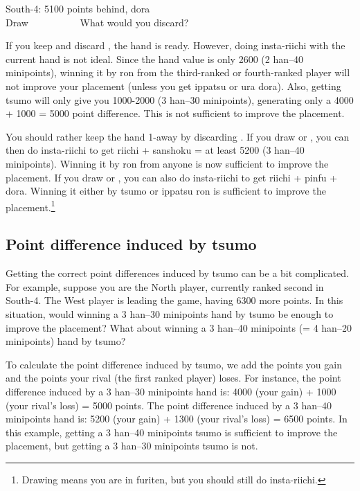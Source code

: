 \bigskip
\begin{itembox}[r]{South-4: 5100 points behind, {\jap dora} {\Large{}}}
\bp
{}~~\\
\hfill\footnotesize{Draw~~~~~~~~~~}
\ep
\vspace{-17pt}
What would you discard?
\end{itembox}
\noindent If you keep {\LARGE{}} and discard {\LARGE{}}, the hand is ready. However, doing insta-riichi with the current hand is not ideal. Since the hand value is only 2600 (2 {\jap han}--40 minipoints), winning it by {\jap ron} from the third-ranked or fourth-ranked player will not improve your placement (unless you get {\jap ippatsu} or {\jap ura dora}). Also, getting {\jap tsumo} will only give you 1000-2000 (3 {\jap han}--30 minipoints), generating only a 4000 + 1000 = 5000 point difference. This is not sufficient to improve the placement. 

\bigskip
You should rather keep the hand 1-away by discarding {\LARGE{}}. If you draw {\LARGE{}} or {\LARGE{}}, you can then do insta-riichi to get riichi + {\jap sanshoku} = at least 5200 (3 {\jap han}--40 minipoints). Winning it by {\jap ron} from anyone is now sufficient to improve the placement. If you draw {\LARGE{}} or {\LARGE{}}, you can also do insta-riichi to get riichi + {\jap pinfu} + {\jap dora}. Winning it either by {\jap tsumo} or {\jap ippatsu ron} is sufficient to improve the placement.\footnote{Drawing  means you are in {\jap furiten}, but you should still do insta-riichi.}

\subsection*{Point difference induced by {\jap tsumo}}
Getting the correct point differences induced by {\jap tsumo} can be a bit complicated. For example, suppose you are the North player, currently ranked second in South-4. The West player is leading the game, having 6300 more points. In this situation, would winning a 3 {\jap han}--30 minipoints hand by {\jap tsumo} be enough to improve the placement? What about winning a 3 {\jap han}--40 minipoints (= 4 {\jap han}--20 minipoints) hand by {\jap tsumo}? 

\bigskip
To calculate the point difference induced by {\jap tsumo}, we add the points you gain and the points your rival (the first ranked player) loses. For instance, the point difference induced by a 3 {\jap han}--30 minipoints hand is: 4000 (your gain) + 1000 (your rival's loss) = 5000 points. The point difference induced by a 3 {\jap han}--40 minipoints hand is: 5200 (your gain) + 1300 (your rival's loss) = 6500 points. 
In this example, getting a 3 {\jap han}--40 minipoints {\jap tsumo} is sufficient to improve the placement, but getting a 3 {\jap han}--30 minipoints {\jap tsumo} is not. 

